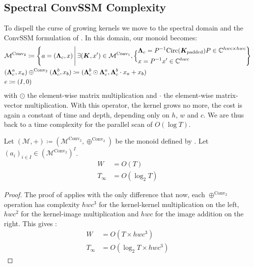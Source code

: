 \documentclass{article}
\begin{document}
\subsection{Spectral ConvSSM Complexity}
\label{app:Spectral_ConvSSM_complexity}
To dispell the curse of growing kernels we move to the spectral domain and the ConvSSM formulation of . In this domain, our monoid becomes:
\begin{align}
\label{eq:M_SSM_spectral}
    &\mathcal{M}^{\mathrm{Conv}_2}\coloneqq \left\{ a = (\bm{\Lambda}_c, x)\,\middle|\,\exists (\bm{K}, x')\in \mathcal{M}^{\mathrm{Conv}_1},\Bigl\{
\begin{aligned}
    &\bm{\Lambda}_c = P^{-1} \mathrm{Circ}(\bm{K}_{\mathrm{padded}}) P \in \mathbb{C}^{hwc \times hwc}\\
    &x = P^{-1} x' \in \mathbb{C}^{h w c}
\end{aligned}
\Bigr.\right\}\\
\label{eq:+_SSM_spectral}
    &(\bm{\Lambda}^a_c, x_a) \oplus^{\mathrm{Conv}_2} (\bm{\Lambda}^b_c, x_b)\coloneqq (\bm{\Lambda}^b_c \odot \bm{\Lambda}^a_c, \bm{\Lambda}^b_c \cdot x_a + x_b)\\
\label{eq:0_SSM_spectral}
    &e\coloneqq(I, 0)
\end{align}
\noindent with $\odot$ the element-wise matrix multiplication and $\cdot$ the element-wise matrix-vector multiplication. With this operator, the kernel grows no more, the cost is again a constant of time and depth, depending only on $h$, $w$ and $c$. We are thus back to a time complexity for the parallel scan of $O(\log T)$.
\begin{proposition}
    Let $(\mathcal{M}, +) \coloneqq (\mathcal{M}^{\mathrm{Conv}_2}, \oplus^{\mathrm{Conv}_2})$ be the monoid defined by . Let $(a_i)_{i\in I}\in (\mathcal{M}^{\mathrm{Conv}_2})^I$.
\begin{align}
    W&= O(T)\\
    T_\infty&= O(\log_2T)
\end{align}
\end{proposition}
\begin{proof}
The proof of  applies with the only difference that now, each $\oplus^{\mathrm{Conv}_2}$ operation has complexity $h w c^3$ for the kernel-kernel multiplication on the left, $h w c^2$ for the kernel-image multiplication and $h w c$ for the image addition on the right. This gives :
\begin{align}
\label{eq:W_spectral}
    W&= O(T \times h w c^3)\\
\label{eq:T_spectral}
    T_\infty&= O(\log_2T \times h w c^3)
\end{align}
\end{proof}
\end{document}
